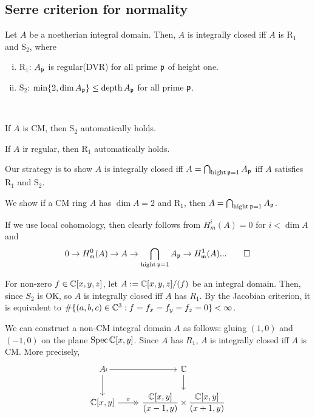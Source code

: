 \documentclass{../../../small}
\newcommand{\depth}{\operatorname{depth}}
\begin{document}
\subsection*{Serre criterion for normality}
\begin{thm*}[5.15]
Let $A$ be a noetherian integral domain.
Then, $A$ is integrally closed iff $A$ is R$_1$ and S$_2$, where
\begin{enumerate}[(i)]
\item R$_1$: $A_{\mathfrak{p}}$ is regular(DVR) for all prime $\mathfrak{p}$ of height one.
\item S$_2$: $\min\{2,\dim A_\fp\}\le\depth A_\fp$ for all prime $\mathfrak{p}$.
\end{enumerate}
\end{thm*}
\begin{rmk*}[5.16]\,
\begin{parts}
\item If $A$ is CM, then S$_2$ automatically holds.
\item If $A$ ir regular, then R$_1$ automatically holds.
\end{parts}
\end{rmk*}

\begin{pf}[Sketch]
Our strategy is to show $A$ is integrally closed iff $A=\bigcap_{\operatorname{hight}\mathfrak{p}=1}A_{\mathfrak{p}}$ iff $A$ satisfies R$_1$ and S$_2$.

We show if a CM ring $A$ has $\dim A=2$ and R$_1$, then $A=\bigcap_{\operatorname{hight}\mathfrak{p}=1}A_{\mathfrak{p}}$.

If we use local cohomology, then clearly follows from $H_m^i(A)=0$ for $i<\dim A$ and
\[0\to H_{\mathfrak{m}}^0(A)\to A\to\bigcap_{\operatorname{hight}\mathfrak{p}=1}A_{\mathfrak{p}}\to H^1_{\mathfrak{m}}(A)...\qedhere\]
\end{pf}



\begin{ex*}[5.17]
For non-zero $f\in\mathbb{C}[x,y,z]$, let $A:=\mathbb{C}[x,y,z]/(f)$ be an integral domain.
Then, since $S_2$ is OK, so $A$ is integrally closed iff $A$ has $R_1$.
By the Jacobian criterion, it is equivalent to $\#\{(a,b,c)\in\mathbb{C}^3:f=f_x=f_y=f_z=0\}<\infty$.
\end{ex*}

\begin{rmk*}[5.18]
We can construct a non-CM integral domain $A$ as follows: gluing $(1,0)$ and $(-1,0)$ on the plane $\operatorname{Spec}\mathbb{C}[x,y]$.
Since $A$ has $R_1$, $A$ is integrally closed iff $A$ is CM.
More precisely,
\[\begin{tikzcd}
A\rar\dar\pullback & \C\dar\\
\C[x,y]\rar[->>]{\pi} &\dfrac{\C[x,y]}{(x-1,y)}\times\dfrac{\C[x,y]}{(x+1,y)}
\end{tikzcd}\]

\end{rmk*}
\end{document}
